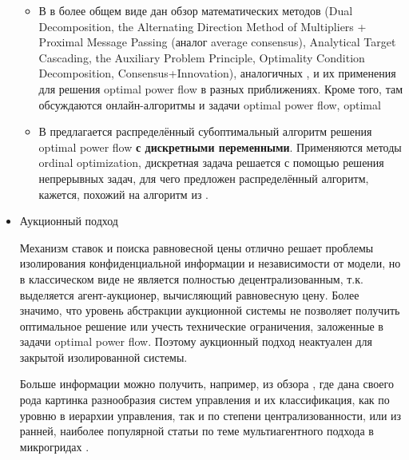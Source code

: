 \begin{itemize}
\begin{itemize}
\item
В \cite{molzahn2017survey} в более общем виде дан обзор математических методов 
(Dual Decomposition,
the Alternating Direction Method of Multipliers + Proximal Message Passing (аналог average consensus), Analytical Target Cascading, the Auxiliary Problem Principle, Optimality
Condition Decomposition, Consensus+Innovation),
аналогичных \cite{loia2013decentralized}, и их применения для решения optimal power flow в разных приближениях.
Кроме того, там обсуждаются онлайн-алгоритмы и задачи optimal power flow, optimal 

\item 
В \cite{lin2008distributed} предлагается распределённый субоптимальный алгоритм решения optimal power flow \textbf{с дискретными переменными}.
Применяются методы ordinal optimization, дискретная задача решается с помощью решения непрерывных задач, для чего предложен распределённый алгоритм, кажется, похожий на алгоритм из \cite{loia2013decentralized}.

\end{itemize}

\item Аукционный подход

Механизм ставок и поиска равновесной цены отлично решает проблемы изолирования конфиденциальной информации и независимости от модели, но в классическом виде не является полностью децентрализованным, т.к. выделяется агент-аукционер, вычисляющий равновесную цену.
Более значимо, что уровень абстракции аукционной системы не позволяет
получить оптимальное решение или учесть технические ограничения, заложенные в задачи optimal power flow.
Поэтому аукционный подход неактуален для закрытой изолированной системы.

Больше информации можно получить, например, из обзора \cite{olivares2014trends}, где дана своего рода картинка разнообразия систем управления и их классификация, как по уровню в иерархии управления, так и по степени централизованности, или из ранней, наиболее популярной статьи по теме мультиагентного подхода в микрогридах \cite{dimeas2005operation}.



\end{itemize}
